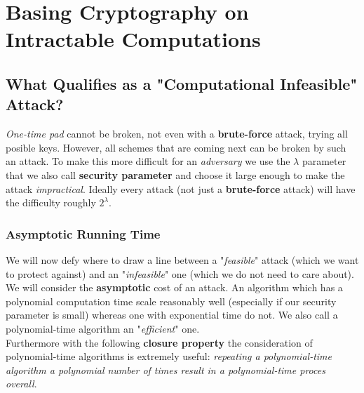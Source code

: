 \documentclass{article}
\begin{document}
	\section{Basing Cryptography on Intractable Computations}
		\begin{adjustwidth}{2em}{}
		\subsection{What Qualifies as a "Computational Infeasible" Attack?}
			\begin{adjustwidth}{2em}{4em}
				\textit{One-time pad} cannot be broken, not even with a \textbf{brute-force} attack, trying all posible keys. However, all schemes that are coming next can be broken by such an attack. To make this more difficult for an \textit{adversary} we use the $\lambda$ parameter that we also call \textbf{security parameter} and choose it large enough to make the attack \textit{impractical}. Ideally every attack (not just a \textbf{brute-force} attack) will have the difficulty roughly $2^{\lambda}$.
				\subsubsection{Asymptotic Running Time}
					\begin{adjustwidth}{2em}{}
						We will now defy where to draw a line between a "\textit{feasible}" attack (which we want to protect against) and an "\textit{infeasible}" one (which we do not need to care about). \\
						We will consider the \textbf{asymptotic} cost of an attack. An algorithm which has a polynomial computation time scale reasonably well (especially if our security parameter is small) whereas one with exponential time do not. We also call a polynomial-time algorithm an "\textit{efficient}" one. \\
						Furthermore with the following \textbf{closure property} the consideration of polynomial-time algorithms is extremely useful: \textit{repeating a polynomial-time algorithm a polynomial number of times result in a polynomial-time proces overall}.
					\end{adjustwidth}

\end{adjustwidth}
\end{adjustwidth}
\end{document}
